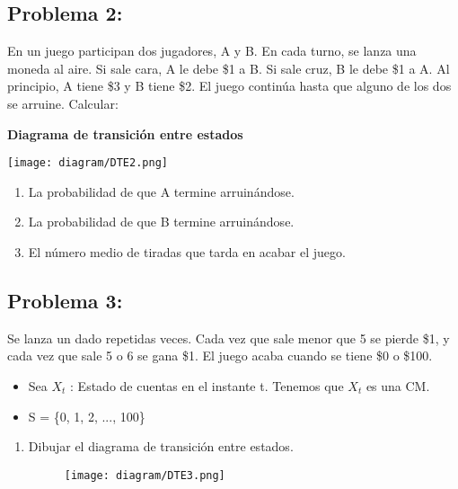 \documentclass{templateNote}
\newcommand{\newparagraph}{\par\vspace{\baselineskip}\noindent}
\begin{document}
\newpage
\subsection{Problema 2:}
En un juego participan dos jugadores, A y B. En cada turno, se lanza una moneda al aire. Si sale cara, A le debe \$1 a B. Si sale cruz, B le debe \$1 a A. Al principio, A tiene \$3 y B tiene \$2. El juego contin\'ua hasta que alguno de los dos se arruine. Calcular:
\newparagraph
\textbf{Diagrama de transici\'on entre estados}
\begin{center}
    \texttt{[image: diagram/DTE2.png]}
\end{center}
\begin{enumerate}
    \item La probabilidad de que A termine arruin\'andose.
    \item La probabilidad de que B termine arruin\'andose.
    \item El n\'umero medio de tiradas que tarda en acabar el juego.
\end{enumerate}

\newpage
\subsection{Problema 3:}
Se lanza un dado repetidas veces. Cada vez que sale menor que 5 se pierde \$1, y cada vez que sale 5 o 6 se gana \$1. El juego acaba cuando se tiene \$0 o \$100.
\begin{itemize}
    \item Sea $X_t$ : Estado de cuentas en el instante t. Tenemos que ${X_t}$ es una CM.
    \item S = \{0, 1, 2, ..., 100\}
\end{itemize}
\begin{enumerate}
    \item Dibujar el diagrama de transici\'on entre estados.
    \begin{figure}[H]
        \centering
        \texttt{[image: diagram/DTE3.png]}
    \end{figure}
\end{enumerate}

\newpage
\end{document}
